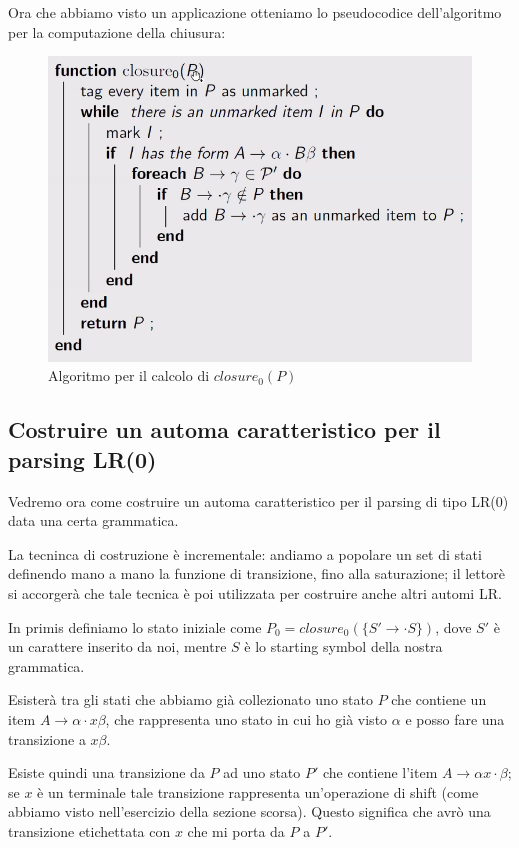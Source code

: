 \documentclass[class=book, crop=false, oneside, 12pt]{standalone}
\begin{document}
Ora che abbiamo visto un applicazione otteniamo lo pseudocodice dell'algoritmo per la
computazione della chiusura:
\begin{figure}[H]
    \centering
    \includegraphics[width=.8\textwidth]{bottom-up-parsing_closure_algorithm.png}
    \caption{Algoritmo per il calcolo di \(closure_0(P)\)}
\end{figure}


\subsection{Costruire un automa caratteristico per il parsing LR(0)}

Vedremo ora come costruire un automa caratteristico per il parsing di tipo LR(0) data una certa grammatica.

La tecninca di costruzione è incrementale: andiamo a popolare un set di stati definendo mano a mano la funzione di transizione, fino alla saturazione; il lettorè si accorgerà che tale tecnica è poi utilizzata per costruire anche altri automi LR.

In primis definiamo lo stato iniziale come \(P_0 = closure_0 (\{S' \to \cdot S\})\), dove \(S'\) è un carattere inserito da noi, mentre \(S\) è lo starting symbol della nostra grammatica.

Esisterà tra gli stati che abbiamo già collezionato uno stato \(P\) che contiene un item \(A \to \alpha \cdot x \beta\), che rappresenta uno stato in cui ho già visto \(\alpha\) e posso fare una transizione a \(x\beta\).

Esiste quindi una transizione da \(P\) ad uno stato \(P'\) che contiene l'item \(A \to \alpha x \cdot \beta\); se \(x\) è un terminale tale transizione rappresenta un'operazione di shift (come abbiamo visto nell'esercizio della sezione scorsa). 
Questo significa che avrò una transizione etichettata con \(x\) che mi porta da \(P\) a \(P'\).
\end{document}
